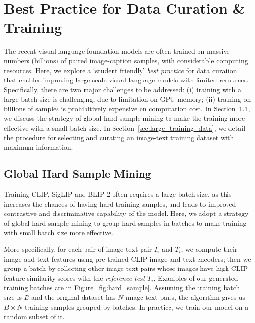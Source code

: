 
\section{Best Practice for Data Curation \& Training}

The recent visual-language foundation models are often trained on massive numbers (billions) of paired image-caption samples, with considerable computing resources. Here, we explore a `student friendly' \emph{best practice} for data curation that enables improving large-scale visual-language models with limited resources.
Specifically, there are two major challenges to be addressed:
(i) training with a large batch size is challenging, due to limitation on GPU memory; (ii) training on billions of samples is prohibitively expensive on computation cost. 
In Section~\ref{sec:hard_mining}, we discuss the strategy of global hard sample mining to make the training more effective with a small batch size. 
In Section~\ref{sec:large_training_data}, we detail the procedure for selecting and curating an image-text training dataset with maximum information.


\subsection{Global Hard Sample Mining}
\label{sec:hard_mining}

Training CLIP, SigLIP and BLIP-2 often requires a large batch size,
as this increases the chances of having hard training samples, 
and leads to improved contrastive and discriminative capability of the model. Here, we adopt a strategy of global hard sample mining to group hard samples in batches to make training with small batch size more effective. 

More specifically, for each pair of image-text pair $I_i$ and $T_i$, we compute their image and text features using pre-trained CLIP image and text encoders; 
then we group a batch by collecting other image-text pairs whose images have high CLIP feature similarity scores with the \emph{reference text} $T_i$. 
Examples of our generated training batches are in Figure~\ref{fig:hard_sample}. Assuming the training batch size is $B$ and the original dataset has $N$ image-text pairs, the algorithm gives us $B \times N$ training samples grouped by batches. In practice, we train our model on a random subset of it. 

